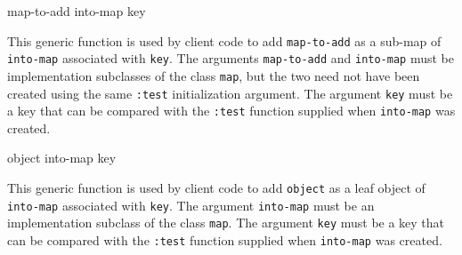  {map-to-add into-map key}

This generic function is used by client code to add
\texttt{map-to-add} as a sub-map of \texttt{into-map} associated with
\texttt{key}.  The arguments \texttt{map-to-add} and \texttt{into-map}
must be implementation subclasses of the class \texttt{map}, but the
two need not have been created using the same \texttt{:test}
initialization argument.  The argument \texttt{key} must be a key that
can be compared with the \texttt{:test} function supplied when
\texttt{into-map} was created.

 {object into-map key}

This generic function is used by client code to add \texttt{object} as
a leaf object of \texttt{into-map} associated with \texttt{key}.  The
argument \texttt{into-map} must be an implementation subclass of the
class \texttt{map}.  The argument \texttt{key} must be a key that can
be compared with the \texttt{:test} function supplied when
\texttt{into-map} was created.
